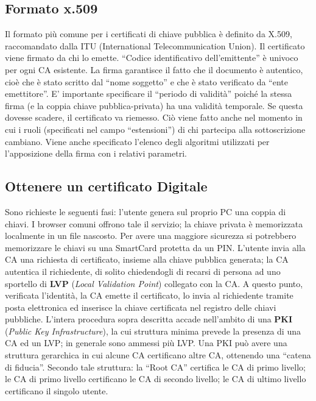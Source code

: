\subsection{Formato x.509}

Il formato più comune per i certificati di chiave pubblica è definito da X.509, raccomandato dalla
ITU (International Telecommunication Union).
Il certificato viene firmato da chi lo emette. “Codice identificativo
dell’emittente” è univoco per ogni
CA esistente. La firma garantisce il fatto che il documento è autentico,
cioè che è stato scritto dal
“nome soggetto” e che è stato verificato da “ente emettitore”.
E’ importante specificare il “periodo di validità” poiché la stessa firma
(e la coppia chiave
pubblica-privata) ha una validità temporale. Se questa dovesse scadere,
il certificato va riemesso.
Ciò viene fatto anche nel momento in cui i ruoli (specificati nel campo
“estensioni”) di chi partecipa
alla sottoscrizione cambiano.
Viene anche specificato l’elenco degli algoritmi utilizzati per
l’apposizione della firma con i relativi
parametri.


\subsection{Ottenere un certificato Digitale}

Sono richieste le seguenti fasi: l’utente genera sul proprio PC una coppia
di chiavi. I browser
comuni offrono tale il servizio; la chiave privata è memorizzata localmente
in un file nascosto. Per
avere una maggiore sicurezza si potrebbero memorizzare le chiavi su una
SmartCard protetta da
un PIN. L’utente invia alla CA una richiesta di certificato, insieme alla
chiave pubblica generata; la
CA autentica il richiedente, di solito chiedendogli di recarsi di persona
ad uno sportello di \textbf{LVP}
(\textit{Local Validation Point}) collegato con la CA.
A questo punto, verificata l’identità, la CA emette il certificato,
lo invia al richiedente tramite posta
elettronica ed inserisce la chiave certificata nel registro delle chiavi
pubbliche.
L’intera procedura sopra descritta accade nell’ambito di una \textbf{PKI}
(\textit{Public Key Infrastructure}), la cui
struttura minima prevede la presenza di una CA ed un LVP; in generale
sono ammessi più LVP.
Una PKI può avere una struttura gerarchica in cui alcune CA certificano
altre CA, ottenendo una
“catena di fiducia”. Secondo tale struttura: la “Root CA” certifica le
CA di primo livello; le CA di
primo livello certificano le CA di secondo livello; le CA di ultimo
livello certificano il singolo utente.

